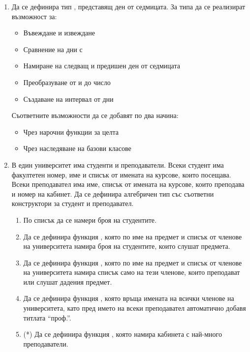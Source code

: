 \begin{enumerate}[]

	\item Да се дефинира тип , представящ ден от седмицата. За типа да се реализират възможност за:
	\begin{itemize}
		\item Въвеждане и извеждане
		\item Сравнение на дни с \code{==,<,>}
		\item Намиране на следващ и предишен ден от седмицата
		\item Преобразуване от и до число
		\item Създаване на интервал от дни
	\end{itemize}
	Съответните възможности да се добавят по два начина:
	\begin{itemize}
		\item Чрез нарочни функции за целта
		\item Чрез наследяване на базови класове
	\end{itemize}


	\item В един университет има студенти и преподаватели. Всеки студент има факултетен номер, име и списък от имената на курсове, които посещава. Всеки преподавател има име, списък от имената на курсове, които преподава и номер на кабинет. Да се дефинира алгебричен тип  със съответни конструктори за студент и преподавател.
	
	\begin{enumerate}[label=\alph*)]
		\item По списък \code{[Member]} да се намери броя на студентите.
		\item Да се дефинира функция , която по име на предмет и списък от членове на университета намира броя на студентите, които слушат предмета.
		\item Да се дефинира функция , която по име на предмет и списък от членове на университета намира списък само на тези членове, които преподават или слушат дадения предмет.
		\item Да се дефинира функция , която връща имената на всички членове на университета, като пред името на всеки преподавател автоматично добавя титлата ``проф.''.
		\item(*) Да се дефинира функция , която намира кабинета с най-много преподаватели.
	\end{enumerate}

\end{enumerate}

